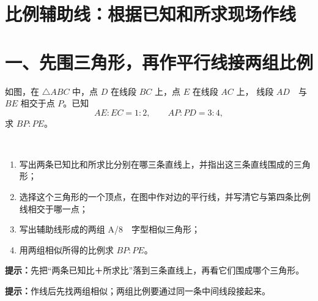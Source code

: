 \documentclass{exam-zh}
\begin{document}
\section*{比例辅助线：根据已知和所求现场作线}

\section*{一、先围三角形，再作平行线接两组比例}


\begin{problem}[points=10]
  \noindent
  \begin{minipage}[t]{\dimexpr\linewidth-60mm-6mm\relax}
    \vspace{0pt}
    如图，在 $\triangle ABC$ 中，点 $D$ 在线段 $BC$ 上，点 $E$ 在线段 $AC$ 上，
线段 $AD$\ \ 与 $BE$ 相交于点 $P$。已知
\[
AE:EC=1:2,\qquad AP:PD=3:4,
\]
求 $BP:PE$。

\ \begin{enumerate}[label=(\arabic*)]
  \item 写出两条已知比和所求比分别在哪三条直线上，并指出这三条直线围成的三角形；
\ \  \item 选择这个三角形的一个顶点，在图中作对边的平行线，并写清它与第四条比例线相交于哪一点；
  \item 写出辅助线形成的两组 A/8\ \ 字型相似三角形；
  \item 用两组相似所得的比例求 $BP:PE$。
\end{enumerate}

    \begin{hintbox}
\textbf{提示：}先把“两条已知比＋所求比”落到三条直线上，再看它们围成哪个三角形。\end{hintbox}
\begin{hintbox}
\textbf{提示：}作线后先找两组相似；两组比例要通过同一条中间线段接起来。\end{hintbox}

  \end{minipage}\hfill
  \begin{diagramcoltikz}{60mm}{第 1 题原始构型，请在图上补作辅助线。}
  }
  \end{diagramcoltikz}
  \par\medskip
  \answerarea[68mm]
\end{problem}


\end{document}
